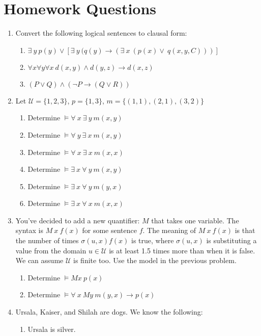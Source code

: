 \documentclass{article}
\begin{document}
\section*{Homework Questions}
\begin{enumerate}
\item Convert the following logical sentences to clausal form:
\begin{enumerate}
\item $\exists\ y\ p(y) \vee [\exists\ y\ (q(y) \rightarrow (\exists\ x\ (p(x) \vee\ q(x,y,C)))]$
\item $\forall x \forall y \forall x\ d(x,y) \wedge d(y,z) \rightarrow d(x,z)$
\item $( P \vee Q) \wedge (\neg P \rightarrow (Q \vee R))$
\end{enumerate}
\item Let $\mathcal{U} = \{1,2,3\}$, $p = \{1,3\}$, $m = \{(1,1),(2,1),(3,2)\}$
\begin{enumerate}
\item Determine $\models \forall\ x\ \exists\ y\ m(x,y)$
\item Determine $\models \forall\ y\ \exists\ x\ m(x,y)$
\item Determine $\models \forall\ x\ \exists\ x\ m(x,x)$
\item Determine $\models \exists \ x\ \forall\ y\ m(x,y)$
\item Determine $\models \exists \ x\ \forall\ y\ m(y,x)$
\item Determine $\models \exists \ x\ \forall\ x\ m(x,x)$
\end{enumerate}
\item You've decided to add a new quantifier: $M$ that takes one variable.  The syntax is $M\ x\ f(x)$ for some sentence $f$.  The meaning of $M\ x\ f(x)$ is that the number of times $\sigma(u,x) f(x)$ is true, where $\sigma(u,x)$ is substituting a value from the domain $u \in \mathcal{U}$ is at least 1.5 times more than when it is false.  We can assume $\mathcal{U}$ is finite too.  Use the model in the previous problem.
\begin{enumerate}
\item Determine $\models M x\ p(x)$
\item Determine $\models \forall \ x\ M y \ m(y,x) \rightarrow p(x)$
\end{enumerate}
\item Ursala, Kaiser, and Shilah are dogs.  We know the following:
\begin{enumerate}
\item Ursala is silver.

\end{enumerate}
\end{enumerate}
\end{document}
